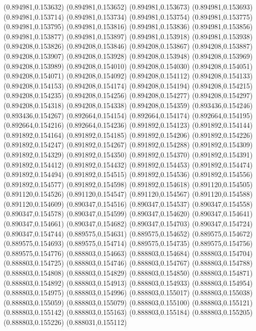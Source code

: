 (0.894981,0.153632)
(0.894981,0.153652)
(0.894981,0.153673)
(0.894981,0.153693)
(0.894981,0.153714)
(0.894981,0.153734)
(0.894981,0.153754)
(0.894981,0.153775)
(0.894981,0.153795)
(0.894981,0.153816)
(0.894981,0.153836)
(0.894981,0.153856)
(0.894981,0.153877)
(0.894981,0.153897)
(0.894981,0.153918)
(0.894981,0.153938)
(0.894208,0.153826)
(0.894208,0.153846)
(0.894208,0.153867)
(0.894208,0.153887)
(0.894208,0.153907)
(0.894208,0.153928)
(0.894208,0.153948)
(0.894208,0.153969)
(0.894208,0.153989)
(0.894208,0.154010)
(0.894208,0.154030)
(0.894208,0.154051)
(0.894208,0.154071)
(0.894208,0.154092)
(0.894208,0.154112)
(0.894208,0.154133)
(0.894208,0.154153)
(0.894208,0.154174)
(0.894208,0.154194)
(0.894208,0.154215)
(0.894208,0.154235)
(0.894208,0.154256)
(0.894208,0.154277)
(0.894208,0.154297)
(0.894208,0.154318)
(0.894208,0.154338)
(0.894208,0.154359)
(0.893436,0.154246)
(0.893436,0.154267)
(0.892664,0.154154)
(0.892664,0.154174)
(0.892664,0.154195)
(0.892664,0.154216)
(0.892664,0.154236)
(0.891892,0.154123)
(0.891892,0.154144)
(0.891892,0.154164)
(0.891892,0.154185)
(0.891892,0.154206)
(0.891892,0.154226)
(0.891892,0.154247)
(0.891892,0.154267)
(0.891892,0.154288)
(0.891892,0.154309)
(0.891892,0.154329)
(0.891892,0.154350)
(0.891892,0.154370)
(0.891892,0.154391)
(0.891892,0.154412)
(0.891892,0.154432)
(0.891892,0.154453)
(0.891892,0.154474)
(0.891892,0.154494)
(0.891892,0.154515)
(0.891892,0.154536)
(0.891892,0.154556)
(0.891892,0.154577)
(0.891892,0.154598)
(0.891892,0.154618)
(0.891120,0.154505)
(0.891120,0.154526)
(0.891120,0.154547)
(0.891120,0.154567)
(0.891120,0.154588)
(0.891120,0.154609)
(0.890347,0.154516)
(0.890347,0.154537)
(0.890347,0.154558)
(0.890347,0.154578)
(0.890347,0.154599)
(0.890347,0.154620)
(0.890347,0.154641)
(0.890347,0.154661)
(0.890347,0.154682)
(0.890347,0.154703)
(0.890347,0.154724)
(0.890347,0.154744)
(0.889575,0.154631)
(0.889575,0.154652)
(0.889575,0.154672)
(0.889575,0.154693)
(0.889575,0.154714)
(0.889575,0.154735)
(0.889575,0.154756)
(0.889575,0.154776)
(0.888803,0.154663)
(0.888803,0.154684)
(0.888803,0.154704)
(0.888803,0.154725)
(0.888803,0.154746)
(0.888803,0.154767)
(0.888803,0.154788)
(0.888803,0.154808)
(0.888803,0.154829)
(0.888803,0.154850)
(0.888803,0.154871)
(0.888803,0.154892)
(0.888803,0.154913)
(0.888803,0.154933)
(0.888803,0.154954)
(0.888803,0.154975)
(0.888803,0.154996)
(0.888803,0.155017)
(0.888803,0.155038)
(0.888803,0.155059)
(0.888803,0.155079)
(0.888803,0.155100)
(0.888803,0.155121)
(0.888803,0.155142)
(0.888803,0.155163)
(0.888803,0.155184)
(0.888803,0.155205)
(0.888803,0.155226)
(0.888031,0.155112)
